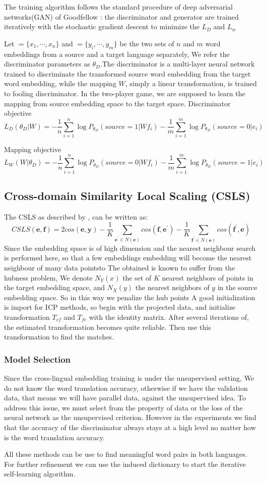 	The training algorithm follows the standard procedure of deep adversarial networks(GAN) of Goodfellow \cite{bibid}: the discriminator and generator are trained iteratively with the stochastic gradient descent to minimize the ${L_D}$ and ${L_w}$

	Let ${=\{ x_1, \cdots, x_n\}}$ and ${ = \{ y_i, \cdots , y_m\}}$ be the two sets of $n$ and $m$ word embeddings from a source and a target language separately, We refer the discriminator parameters as ${\theta_D}$.The discriminator is a multi-layer neural network trained to discriminate the transformed source word embedding from the target word embedding, while the mapping $W$, simply a linear transformation, is trained to fooling discriminator. In the two-player game, we are supposed to learn the mapping from source embedding space to the target space.
	Discriminator objective  
	\[ L_D(\theta_D | W) =  -\frac{1}{n} \sum_{i=1}^{n} \log P_{\theta_D}(source = 1| Wf_i) - \frac{1}{m} \sum_{i=1}^{m} \log P_{\theta_D}(source=0| e_i) \]	
	
	Mapping objective 
	\[ L_W(W|\theta_D) =  -\frac{1}{n} \sum_{i=1}^{n}\log P_{\theta_D}(source=0|W f_i) - \frac{1}{m} \sum_{i=1}^{m} \log P_{\theta_D}(source = 1 | e_i) \]
	
	
	\subsection{Cross-domain Similarity Local Scaling (CSLS)}
	The CSLS as described by \cite{conneau2017word}, can be written as:
	\[ CSLS(\bm{e}, \bm{f}) = 2 cos(\bm{e}, \bm{y}) - \frac{1}{K} \sum_{\bm{e^{\prime}} \in N(\bm{e})} cos(\bm{f}, \bm{e^{\prime}})- \frac{1}{K} \sum_{\bm{f^{\prime}} \in N(\bm{e})} cos(\bm{f^{\prime}}, \bm{e}) \]
	Since the embedding space is of high dimension and the nearest neighbour search is performed here, so that a few embeddings embedding will become the nearest neighbour of many data pointsto The obtained is known to suffer from the hubness problem, 
	We denote ${N_Y(x)}$ the set of ${K}$ nearest neighbors of points in the target embedding space, and ${N_X(y)}$ the nearest neighbors of ${y}$ in the source embedding space. 
	So in this way we penalize the hub points
	A good initialization is import for ICP methods, so begin with the projected data, and initialize transformation ${T_{ef}}$ and ${T_{fe}}$ with the identity matrix.
	After several iterations of, the estimated transformation becomes quite reliable.  Then use this transformation to find the matches.
	\subsubsection{Model Selection}
	Since the cross-lingual embedding training is under the unsupervised setting, We do not know the word translation accuracy, otherwise if we have the validation data, that means we will have parallel data, against the unsupervised idea. To address this issue, we must select from the property of data or the loss of the neural network as the unsupervised criterion. However in the experiments we find that the accuracy of the discriminator always stays at a high level no matter how is the word translation accuracy. 
	
	All these methods can be use to find meaningful word pairs in both languages. For further refinement we can use the induced dictionary to start the iterative self-learning algorithm. 
	
	